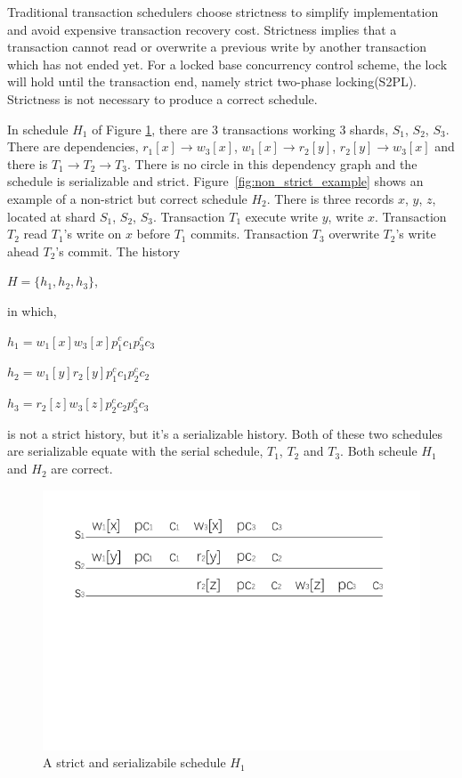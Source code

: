 \documentclass[conference]{IEEEtran}
\begin{document}
Traditional transaction schedulers choose strictness\cite{DBLP:conf/vldb/Raz92} to simplify implementation and avoid expensive transaction recovery cost.
Strictness implies that a transaction cannot read or overwrite a previous write by another transaction which has not ended yet.
For a locked base concurrency control scheme, the lock will hold until the transaction end, namely strict two-phase locking(S2PL).
Strictness is not necessary to produce a correct schedule.

In schedule ${H_1}$ of Figure \ref{fig:strict_example}, there are 3 transactions working 3 shards, ${S_1}$, ${S_2}$, ${S_3}$.
There are dependencies, ${r_1[x] \rightarrow w_3[x]}$, ${w_1[x] \rightarrow r_2[y]}$, ${r_2[y] \rightarrow w_3[x]}$ and there is ${T_1 \rightarrow T_2 \rightarrow T_3}$.
There is no circle in this dependency graph and the schedule is serializable and strict. 
Figure~\ref{fig:non_strict_example} shows an example of a non-strict but correct schedule ${H_2}$.
There is three records ${x}$, ${y}$, ${z}$, located at shard ${S_1}$, ${S_2}$, ${S_3}$.
Transaction ${T_1}$ execute write ${y}$, write ${x}$.
Transaction ${T_2}$ read ${T_1}$'s write on ${x}$ before ${T_1}$ commits.
Transaction ${T_3}$ overwrite ${T_2}$'s write ahead ${T_2}$'s commit.
The history 

\begin{center}
  ${H = \{h_1, h_2, h_3\}}$,

\end{center}

in which, 

\begin{center}
  ${h_1=w_1[x]w_3[x]p^c_1c_1p^c_3c_3}$

${h_2=w_1[y]r_2[y]p^c_1c_1p^c_2c_2}$

${h_3=r_2[z]w_3[z]p^c_2c_2p^c_3c_3 }$ 
\end{center}


is not a strict history, but it's a serializable history. 
Both of these two schedules are serializable equate with the serial schedule, ${T_1}$, ${T_2}$ and ${T_3}$.
Both scheule ${H_1}$ and ${H_2}$ are correct.


\begin{figure}[htbp]
  \centerline{\includegraphics[scale=1]{figure/schedule_strict.pdf}}
  \caption{A strict and serializabile schedule ${H_1}$}
  \label{fig:strict_example}
\end{figure}
\end{document}
